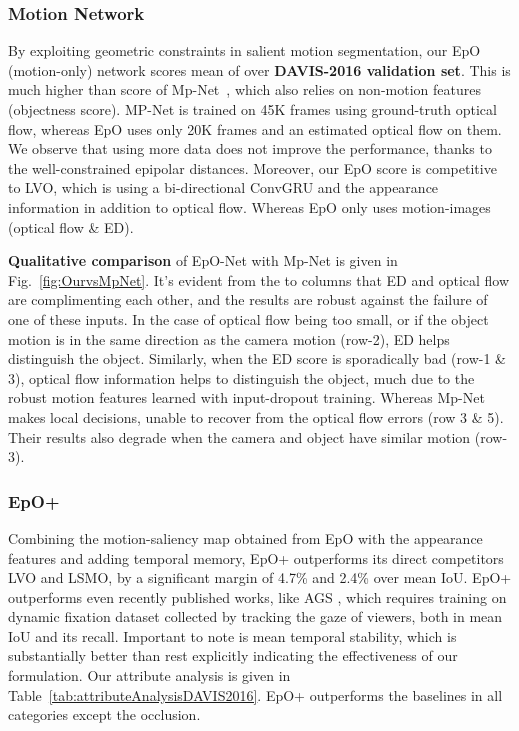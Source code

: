 \documentclass[10pt,twocolumn,letterpaper]{article}
\newcommand{\rowSpace}{\vspace{-0.4cm}}
\begin{document}
\vspace{-0.25cm}

\subsubsection{Motion Network} 
By exploiting geometric constraints in salient motion segmentation, our EpO (motion-only) network scores mean  of  over \textbf{DAVIS-2016 validation set}. 
This is much higher than  score of Mp-Net~\cite{MpNet}, which also relies on non-motion features (objectness score). MP-Net is trained on 45K frames using ground-truth optical flow, whereas EpO uses only 20K frames and an estimated optical flow on them. We observe that using more data does not improve the performance, thanks to the well-constrained epipolar distances. Moreover, our EpO score is competitive to LVO, which is using a bi-directional ConvGRU and the appearance information in addition to optical flow. Whereas EpO only uses motion-images (optical flow \& ED). 

\textbf{Qualitative comparison} of EpO-Net with Mp-Net is given in Fig.~\ref{fig:OurvsMpNet}. 
It's evident from the  to  columns that ED and optical flow are complimenting each other, and the results are robust against the failure of one of these inputs.
In the case of optical flow being too small, or if the object motion is in the same direction as the camera motion (row-2), ED helps distinguish the object. 
Similarly, when the ED score is sporadically bad (row-1 \& 3), optical flow information helps to distinguish the object, much due to the robust motion features learned with input-dropout training.
Whereas Mp-Net makes local decisions, unable to recover from the optical flow errors (row 3 \& 5). Their results also degrade when the camera and object have similar motion (row-3).  
\rowSpace

\subsubsection{EpO+}
Combining the motion-saliency map obtained from EpO with the appearance features and adding temporal memory, EpO+ outperforms its direct competitors LVO and LSMO, by a significant margin of 4.7\% and 2.4\% over mean IoU. 
EpO+ outperforms even recently published works, like AGS \cite{ags}, which requires training on dynamic fixation dataset collected by tracking the gaze of viewers, both in mean IoU and its recall. 
Important to note is mean temporal stability, which is substantially better than rest explicitly indicating the effectiveness of our formulation. 
Our attribute analysis is given in Table~\ref{tab:attributeAnalysisDAVIS2016}. EpO+ outperforms the baselines in all categories except the occlusion.
\end{document}
